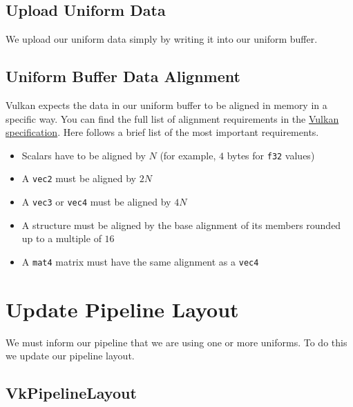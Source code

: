 \subsection{Upload Uniform Data}

We upload our uniform data simply by writing it into our uniform buffer.

\begin{minipage}{\linewidth}{\noindent}
    
\end{minipage}

\subsection{Uniform Buffer Data Alignment}

Vulkan expects the data in our uniform buffer to be aligned in memory
in a specific way.
You can find the full list of alignment requirements in the
\href{https://www.khronos.org/registry/vulkan/specs/1.3-extensions/html/chap15.html#interfaces-resources-layout}{Vulkan specification}.
Here follows a brief list of the most important requirements.

\begin{itemize}
\item Scalars have to be aligned by $N$ (for example, $4$ bytes for \texttt{f32} values)
\item A \texttt{vec2} must be aligned by $2N$
\item A \texttt{vec3} or \texttt{vec4} must be aligned by $4N$
\item A structure must be aligned by the base alignment
of its members rounded up to a multiple of $16$
\item A \texttt{mat4} matrix must have the same alignment as a \texttt{vec4}
\end{itemize}

\section{Update Pipeline Layout}

We must inform our pipeline that we are using one or more uniforms.
To do this we update our pipeline layout.

\subsection{VkPipelineLayout}

